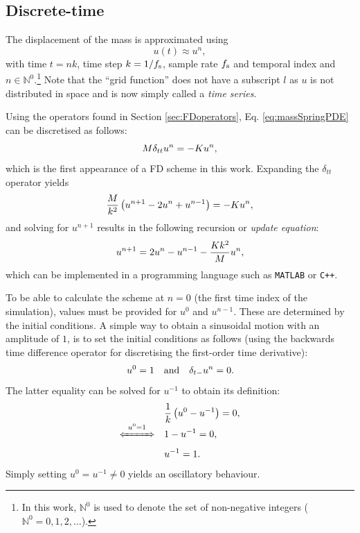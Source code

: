 \subsection{Discrete-time}
The displacement of the mass is approximated using 
\begin{equation}
    u(t) \approx u^n,
\end{equation}
with time $t = nk$, time step $k = 1/f_\text{s}$, sample rate $f_\text{s}$ and temporal index and $n \in \mathbb{N}^0$.\footnote{In this work, $\mathbb{N}^0$ is used to denote the set of non-negative integers ($\mathbb{N}^0 = 0, 1, 2, 
\hdots$).} Note that the ``grid function'' does not have a subscript $l$ as $u$ is not distributed in space and is now simply called a \textit{time series}.

Using the operators found in Section 
\ref{sec:FDoperators}, Eq. \eqref{eq:massSpringPDE} can be discretised as follows:
\begin{equation}\label{eq:massSpringFDS}
    M \delta_{tt} u^n = -Ku^n,
\end{equation}
which is the first appearance of a FD scheme in this work. Expanding the $\delta_{tt}$ operator yields 
\begin{equation*}
    \frac{M}{k^2}\left(u^{n+1}-2u^n+u^{n-1}\right) = -Ku^n,\nonumber
\end{equation*}
and solving for $u^{n+1}$ results in the following recursion or \textit{update equation}:
\begin{equation}\label{eq:massSpringUpdate}
    u^{n+1} = 2u^n - u^{n-1} - \frac{Kk^2}{M} u^n,
\end{equation}
which can be implemented in a programming language such as \texttt{MATLAB} or \texttt{C++}. %

To be able to calculate the scheme at $n=0$ (the first time index of the simulation), values must be provided for $u^0$ and $u^{n-1}$. These are determined by the initial conditions. A simple way to obtain a sinusoidal motion with an amplitude of $1$, is to set the initial conditions as follows (using the backwards time difference operator for discretising the first-order time derivative): 
%
\begin{equation}
    u^0 = 1 \quad \text{and} \quad \delta_{t-} u^n = 0.
\end{equation}
The latter equality can be solved for $u^{-1}$ to obtain its definition: 
\begin{align*}
    &\frac{1}{k}\left(u^0 - u^{-1}\right) = 0,\\[-1em]
    \xLeftrightarrow{\mystrut\ u^0 = 1\ }\quad &1 - u^{-1} = 0,\\[0.1em]
 &u^{-1} = 1.
\end{align*}
Simply setting $u^0 = u^{-1} \neq 0$ yields an oscillatory behaviour. 

